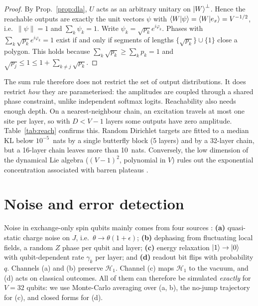 \begin{proof}
By Prop.~\ref{prop:dla}, $U$ acts as an arbitrary unitary on $\ket W^\perp$. Hence the reachable outputs
are exactly the unit vectors $\psi$ with $\braket{W|\psi}=\braket{W|e_x}=V^{-1/2}$, i.e.\
$\|\psi\|=1$ and $\sum_k\psi_k=1$. Write $\psi_k=\sqrt{p_k}e^{i\varphi_k}$. Phases with
$\sum_k\sqrt{p_k}e^{i\varphi_k}=1$ exist if and only if segments of lengths $\{\sqrt{p_k}\}\cup\{1\}$
close a polygon. This holds because $\sum_k\sqrt{p_k}\ge\sum_kp_k=1$ and
$\sqrt{p_j}\le1\le 1+\sum_{k\ne j}\sqrt{p_k}$.
\end{proof}
The sum rule therefore does not restrict the set of output distributions. It does restrict
\emph{how} they are parameterised: the amplitudes are coupled through a shared phase constraint, unlike
independent softmax logits. Reachability also needs enough depth. On a nearest-neighbour chain, an
excitation travels at most one site per layer, so with $D<V-1$ layers some outputs have zero
amplitude. Table~\ref{tab:reach} confirms this. Random Dirichlet targets are fitted to a median KL below
$10^{-5}$~nats by a single butterfly block (5 layers) and by a 32-layer chain, but a 16-layer chain
leaves more than 10~nats.
Conversely, the low dimension of the dynamical Lie algebra ($(V-1)^2$, polynomial in $V$) rules out
the exponential concentration associated with barren plateaus \citep{mcclean2018barren,ragone2024lie}.

\section{Noise and error detection}
\label{sec:noise-theory}
Noise in exchange-only spin qubits mainly comes from four sources \citep{burkard2023semiconductor}:
\textbf{(a)} quasi-static charge noise on $J$, i.e.\ $\theta\to\theta(1+\epsilon)$;
\textbf{(b)} dephasing from fluctuating local fields, a random $Z$ phase per qubit and layer;
\textbf{(c)} energy relaxation $\ket1\to\ket0$ with qubit-dependent rate $\gamma_k$ per layer; and
\textbf{(d)} readout bit flips with probability $q$. Channels (a) and (b) preserve $\mathcal H_1$. Channel
(c) maps $\mathcal H_1$ to the vacuum, and (d) acts on classical outcomes. All of them can therefore be
simulated \emph{exactly} for $V=32$ qubits: we use Monte-Carlo averaging over (a, b), the no-jump
trajectory for (c), and closed forms for (d).

